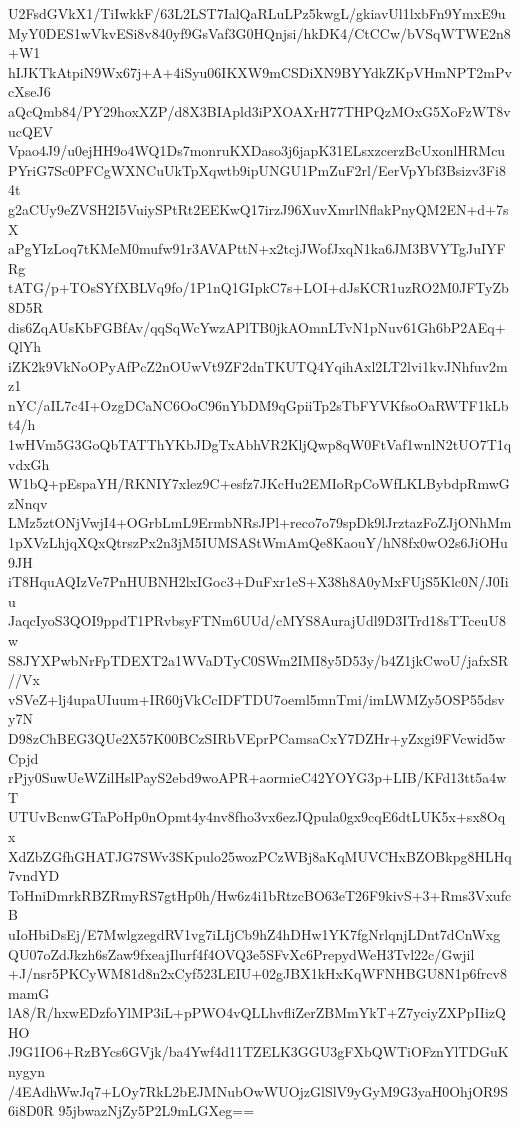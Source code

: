 U2FsdGVkX1/TiIwkkF/63L2LST7IalQaRLuLPz5kwgL/gkiavUl1lxbFn9YmxE9u
MyY0DES1wVkvESi8v840yf9GsVaf3G0HQnjsi/hkDK4/CtCCw/bVSqWTWE2n8+W1
hIJKTkAtpiN9Wx67j+A+4iSyu06IKXW9mCSDiXN9BYYdkZKpVHmNPT2mPvcXseJ6
aQcQmb84/PY29hoxXZP/d8X3BIApld3iPXOAXrH77THPQzMOxG5XoFzWT8vucQEV
Vpao4J9/u0ejHH9o4WQ1Ds7monruKXDaso3j6japK31ELsxzcerzBcUxonlHRMcu
PYriG7Sc0PFCgWXNCuUkTpXqwtb9ipUNGU1PmZuF2rl/EerVpYbf3Bsizv3Fi84t
g2aCUy9eZVSH2I5VuiySPtRt2EEKwQ17irzJ96XuvXmrlNflakPnyQM2EN+d+7sX
aPgYIzLoq7tKMeM0mufw91r3AVAPttN+x2tcjJWofJxqN1ka6JM3BVYTgJuIYFRg
tATG/p+TOsSYfXBLVq9fo/1P1nQ1GIpkC7s+LOI+dJsKCR1uzRO2M0JFTyZb8D5R
dis6ZqAUsKbFGBfAv/qqSqWcYwzAPlTB0jkAOmnLTvN1pNuv61Gh6bP2AEq+QlYh
iZK2k9VkNoOPyAfPcZ2nOUwVt9ZF2dnTKUTQ4YqihAxl2LT2lvi1kvJNhfuv2mz1
nYC/aIL7c4I+OzgDCaNC6OoC96nYbDM9qGpiiTp2sTbFYVKfsoOaRWTF1kLbt4/h
1wHVm5G3GoQbTATThYKbJDgTxAbhVR2KljQwp8qW0FtVaf1wnlN2tUO7T1qvdxGh
W1bQ+pEspaYH/RKNIY7xlez9C+esfz7JKcHu2EMIoRpCoWfLKLBybdpRmwGzNnqv
LMz5ztONjVwjI4+OGrbLmL9ErmbNRsJPl+reco7o79spDk9lJrztazFoZJjONhMm
1pXVzLhjqXQxQtrszPx2n3jM5IUMSAStWmAmQe8KaouY/hN8fx0wO2s6JiOHu9JH
iT8HquAQIzVe7PnHUBNH2lxIGoc3+DuFxr1eS+X38h8A0yMxFUjS5Klc0N/J0Iiu
JaqcIyoS3QOI9ppdT1PRvbsyFTNm6UUd/cMYS8AurajUdl9D3ITrd18sTTceuU8w
S8JYXPwbNrFpTDEXT2a1WVaDTyC0SWm2IMI8y5D53y/b4Z1jkCwoU/jafxSR//Vx
vSVeZ+lj4upaUIuum+IR60jVkCcIDFTDU7oeml5mnTmi/imLWMZy5OSP55dsvy7N
D98zChBEG3QUe2X57K00BCzSIRbVEprPCamsaCxY7DZHr+yZxgi9FVcwid5wCpjd
rPjy0SuwUeWZilHslPayS2ebd9woAPR+aormieC42YOYG3p+LIB/KFd13tt5a4wT
UTUvBcnwGTaPoHp0nOpmt4y4nv8fho3vx6ezJQpula0gx9cqE6dtLUK5x+sx8Oqx
XdZbZGfhGHATJG7SWv3SKpulo25wozPCzWBj8aKqMUVCHxBZOBkpg8HLHq7vndYD
ToHniDmrkRBZRmyRS7gtHp0h/Hw6z4i1bRtzcBO63eT26F9kivS+3+Rms3VxufcB
uIoHbiDsEj/E7MwlgzegdRV1vg7iLIjCb9hZ4hDHw1YK7fgNrlqnjLDnt7dCnWxg
QU07oZdJkzh6sZaw9fxeajIlurf4f4OVQ3e5SFvXc6PrepydWeH3Tvl22c/Gwjil
+J/nsr5PKCyWM81d8n2xCyf523LEIU+02gJBX1kHxKqWFNHBGU8N1p6frcv8mamG
lA8/R/hxwEDzfoYlMP3iL+pPWO4vQLLhvfliZerZBMmYkT+Z7yciyZXPpIIizQHO
J9G1IO6+RzBYcs6GVjk/ba4Ywf4d11TZELK3GGU3gFXbQWTiOFznYlTDGuKnygyn
/4EAdhWwJq7+LOy7RkL2bEJMNubOwWUOjzGlSlV9yGyM9G3yaH0OhjOR9S6i8D0R
95jbwazNjZy5P2L9mLGXeg==
